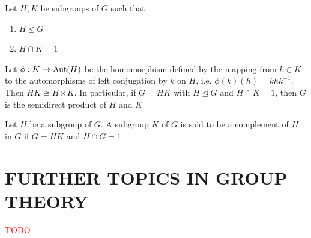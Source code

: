 \begin{theorem}
	Let $H, K$ be subgroups of $G$ such that
	\begin{enumerate}
		\item $H \trianglelefteq G$
		\item $H \cap K = 1$
	\end{enumerate}
	Let $\phi: K \to \operatorname{Aut}(H)$ be the homomorphism defined by the mapping from $k \in K$ to the automorphisms of left conjugation by $k$ on $H$, i.e. $\phi(k)(h) = khk^{-1}$. Then $HK \cong H \rtimes K$. In particular, if $G = HK$ with $H \trianglelefteq G$ and $H \cap K = 1$, then $G$ is the semidirect product of $H$ and $K$
\end{theorem}

\begin{definition}[Complement]
	Let $H$ be a subgroup of $G$. A subgroup $K$ of $G$ is said to be a complement of $H$ in $G$ if $G = HK$ and $H \cap G = 1$
\end{definition}

\section{FURTHER TOPICS IN GROUP THEORY}

\textcolor{red}{TODO}